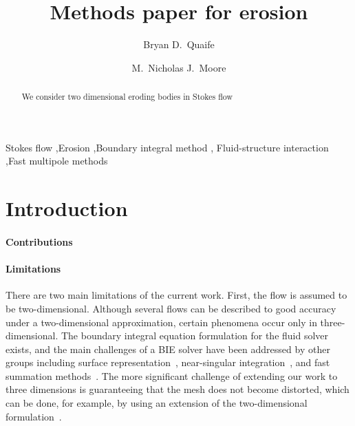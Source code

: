 \documentclass[preprint, 10pt]{elsarticle}
\begin{document}
\title{Methods paper for erosion}

\author[Bryan]{Bryan D.~Quaife}
\author[Nick]{M.~Nicholas J.~Moore}
\address[Nick]{Department of Mathematics and Geophysical Fluid Dynamics Institute, Florida State University, Tallahassee, FL, 32306.}
\address[Bryan]{Department of Scientific Computing and Geophysical Fluid Dynamics Institute, Florida State University, Tallahassee, FL, 32306.}

\begin{abstract} 
We consider two dimensional eroding bodies in Stokes flow
\end{abstract}

\begin{keyword}
  Stokes flow \sep Erosion \sep Boundary integral method \sep
  Fluid-structure interaction \sep Fast multipole methods 
\end{keyword}

\maketitle

\section{Introduction\label{s:intro}}

\paragraph{Contributions}


\paragraph{Limitations} There are two main limitations of the current
work.  First, the flow is assumed to be two-dimensional.  Although
several flows can be described to good accuracy under a two-dimensional
approximation, certain phenomena occur only in three-dimensional.  The
boundary integral equation formulation for the fluid solver exists, and
the main challenges of a BIE solver have been addressed by other groups
including surface representation~\cite{yin-bir-zor2006,
vee-rah-bir-zor2011}, near-singular integration~\cite{yin-bir-zor2006,
kli-tor2016b}, and fast summation methods~\cite{yin-bir-zor2004,
ros-ols2015}.  The more significant challenge of extending our work to
three dimensions is guaranteeing that the mesh does not become
distorted, which can be done, for example, by using an extension of the
two-dimensional {\thL} formulation~\cite{amb-sie-tlu2013}.
\end{document}
